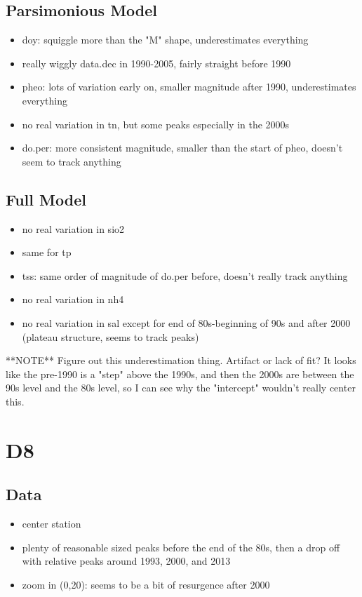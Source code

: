 \documentclass[12pt]{amsart}
\begin{document}
\subsection{Parsimonious Model}
\begin{itemize}
\item doy: squiggle more than the "M" shape, underestimates everything
\item really wiggly data.dec in 1990-2005, fairly straight before 1990
\item pheo: lots of variation early on, smaller magnitude after 1990, underestimates everything
\item no real variation in tn, but some peaks especially in the 2000s
\item  do.per: more consistent magnitude, smaller than the start of pheo, doesn't seem to track anything
\end{itemize}
\subsection{Full Model}
\begin{itemize}
\item no real variation in sio2
\item same for tp
\item tss: same order of magnitude of do.per before, doesn't really track anything
\item no real variation in nh4
\item no real variation in sal except for end of 80s-beginning of 90s and after 2000 (plateau structure, seems to track peaks)
\end{itemize}
**NOTE** Figure out this underestimation thing. Artifact or lack of fit?
It looks like the pre-1990 is a "step" above the 1990s, and then the 2000s are between the 90s level and the 80s level, so I can see why the "intercept" wouldn't really center this.
\section{D8}
\subsection{Data}
\begin{itemize}
\item center station
\item plenty of reasonable sized peaks before the end of the 80s, then a drop off with relative peaks around 1993, 2000, and 2013
\item zoom in (0,20): seems to be a bit of resurgence after 2000
\end{itemize}
\end{document}
